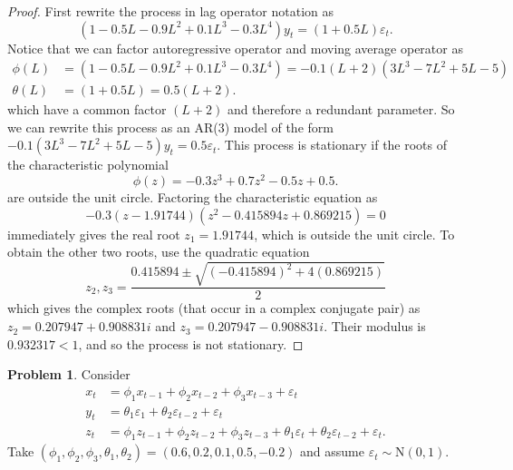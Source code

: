 \documentclass[oneside,reqno]{amsart}
\newcommand{\eps}{\varepsilon}
\newcommand{\N}{\mathrm N}
\theoremstyle{definition}
\newtheorem{prob}{Problem}
\begin{document}
\begin{proof}
First rewrite the process in lag operator notation as
\[
	(1-0.5L - 0.9 L^2 + 0.1 L^3 - 0.3 L^4)y_t = (1+0.5 L)\eps_t.
\]
Notice that we can factor autoregressive operator and moving average operator as 
\begin{align*}
	\phi(L) &= (1-0.5L - 0.9 L^2 + 0.1 L^3 - 0.3 L^4) = -0.1 (L + 2) (3L^3 - 7L^2 + 5L - 5) \\
	\theta(L) &= (1+0.5 L) = 0.5 (L+2).
\end{align*}
which have a common factor $(L+2)$ and therefore a redundant parameter. So we can rewrite this process as an AR(3) model of the form $-0.1(3L^3 - 7L^2 + 5L - 5)y_t = 0.5 \eps_t$. This process is stationary if the roots of the characteristic polynomial
\[
	\phi(z) = -0.3z^3 + 0.7z^2  - 0.5z + 0.5.
\]
are outside the unit circle. Factoring the characteristic equation as 
\[
	-0.3 (z - 1.91744) (z^2 - 0.415894 z + 0.869215) = 0
\]
immediately gives the real root $z_1 = 1.91744$, which is outside the unit circle. To obtain the other two roots, use the quadratic equation 
\[
	z_2, z_3 = \frac{0.415894 \pm \sqrt{(-0.415894)^2 + 4(0.869215)}}{2}
\] 
which gives the complex roots (that occur in a complex conjugate pair) as $z_2 = 0.207947 + 0.908831 i$ and $z_3= 0.207947 - 0.908831 i$. Their modulus is $0.932317 < 1$, and so the process is not stationary. 
\end{proof}

\begin{prob}
Consider 
\begin{align*}
	x_t &= \phi_1 x_{t-1} + \phi_2 x_{t-2} + \phi_3 x_{t-3} + \eps_t \\
	y_t &= \theta_1 \eps_1 + \theta_2 \eps_{t-2} + \eps_t \\
	z_t &= \phi_1 z_{t-1} + \phi_2 z_{t-2} + \phi_3 z_{t-3} + \theta_1 \eps_t + \theta_2 \eps_{t-2} + \eps_t.
\end{align*}
Take $(\phi_1, \phi_2, \phi_3, \theta_1, \theta_2) = (0.6, 0.2, 0.1, 0.5, -0.2)$ and assume $\eps_t \sim \N(0,1)$.
\end{prob}
\end{document}

